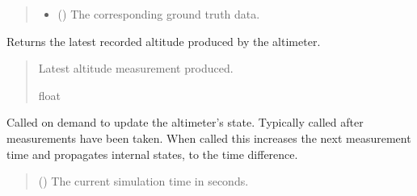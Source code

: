 \documentclass[letterpaper,10pt,english]{sphinxmanual}
\begin{document}
\begin{fulllineitems}
\begin{fulllineitems}
\begin{quote}
\begin{description}
\begin{itemize}
\item {} 
\sphinxAtStartPar
{} ({\hyperref[\detokenize{modules/waypoints/trajectory:qnav.waypoints.trajectory.GroundTruth}]{}}) \textendash{} The corresponding ground truth data.

\end{itemize}

\end{description}\end{quote}

\end{fulllineitems}


\begin{fulllineitems}
\label{\detokenize{modules/measurement/altimeter:qnav.measurement.altimeter.Altimeter.last_measurement}}
\pysigstartsignatures
{}
\pysigstopsignatures
\sphinxAtStartPar
Returns the latest recorded altitude produced by the altimeter.
\begin{quote}\begin{description}
\sphinxAtStartPar
Latest altitude measurement produced.

\sphinxAtStartPar
float

\end{description}\end{quote}

\end{fulllineitems}


\begin{fulllineitems}
\label{\detokenize{modules/measurement/altimeter:qnav.measurement.altimeter.Altimeter.update}}
\pysigstartsignatures
{}
\pysigstopsignatures
\sphinxAtStartPar
Called on demand to update the altimeter’s state.
Typically called after measurements have been taken. When called
this increases the next measurement time and propagates internal
states, to the time difference.
\begin{quote}\begin{description}
\sphinxAtStartPar
{} () \textendash{} The current simulation time in seconds.


\end{description}
\end{quote}
\end{fulllineitems}
\end{fulllineitems}
\end{document}
